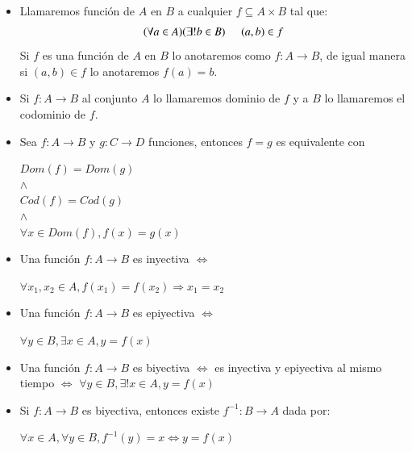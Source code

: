 \documentclass[letterpaper,11pt]{article}
\newcommand{\ssi}{\Longleftrightarrow} %
\theoremstyle{plain}
\begin{document}
\begin{framed}
		\begin{multicols}{2}
		    \begin{itemize}  
                \item Llamaremos función de $A$ en $B$ a cualquier $f\subseteq A \times B$ tal que:
                        $$(\forall a \in A)(\exists ! b \in B) \hspace{5 mm}(a,b)\in f$$
                    Si $f$ es una función de $A$ en $B$ lo anotaremos como $f:A \to B$, de igual manera si $(a,b)\in f$ lo anotaremos $f(a)=b$.
                \item  Si $f:A\to B$ al conjunto $A$ lo llamaremos dominio de $f$ y a $B$ lo llamaremos el codominio de $f$.
                
                \item Sea $f: A \to B$ y $g: C \to D$ funciones, entonces $f=g$ es equivalente con 
                    \begin{center}
                        $Dom(f)=Dom(g)$\\ 
                        $\land$\\ 
                        $Cod(f)=Cod(g)$\\ 
                        $\land$\\
                        $\forall x \in Dom(f), f(x)=g(x)$
                    \end{center}
                \item Una función $f: A \to B$ es inyectiva $\ssi$ \begin{center}$ \forall x_{1},x_{2} \in A, f(x_{1})=f(x_{2}) \Rightarrow x_{1}=x_{2} $\end{center}
                
                \item Una función $f: A \to B$ es epiyectiva $\ssi$ \begin{center}$\forall y \in B, \exists x \in A, y=f(x) $ \end{center}
    
                \item Una función $f: A \to B$ es biyectiva $\ssi$ es inyectiva y epiyectiva al mismo tiempo $\ssi$ $\forall y \in B, \exists ! x \in A, y=f(x) $
    
                \item Si $f: A \to B$ es biyectiva, entonces existe $f^{-1}:B \to A$ dada por:
                    \begin{center}
                        $ \forall x \in A, \forall y \in B, f^{-1}(y)=x \ssi y=f(x)$
                    \end{center}
    

\end{itemize}
\end{multicols}
\end{framed}
\end{document}
